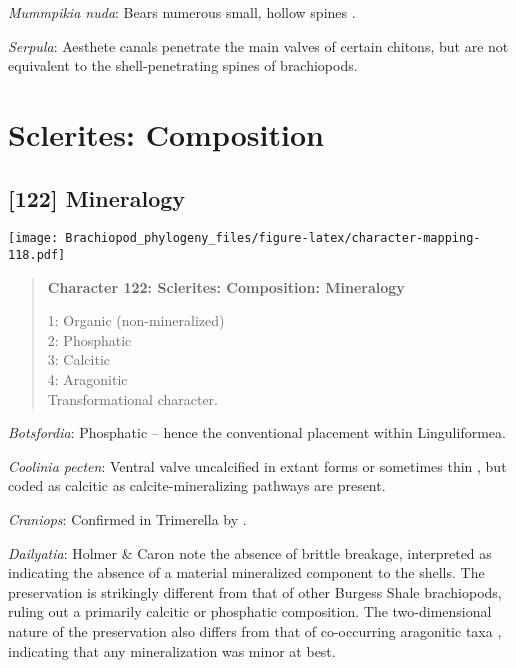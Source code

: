 \documentclass[openany]{book}
\theoremstyle{definition}
\theoremstyle{definition}
\theoremstyle{definition}
\theoremstyle{remark}
\begin{document}
\hypertarget{Mummpikia_nuda-coding-121}{}
\emph{Mummpikia nuda}: Bears numerous small, hollow spines
\citep{Williams2000LinguliformeaCraniiformea}.

\hypertarget{Serpula-coding-121}{}
\emph{Serpula}: Aesthete canals penetrate the main valves of certain
chitons, but are not equivalent to the shell-penetrating spines of
brachiopods.

\section{Sclerites: Composition}\label{sclerites-composition}

\subsection*{{[}122{]} Mineralogy}\label{mineralogy}

\texttt{[image: Brachiopod\_phylogeny\_files/figure-latex/character-mapping-118.pdf]}

\begin{quote}
\textbf{Character 122: Sclerites: Composition: Mineralogy}

1: Organic (non-mineralized)\\
2: Phosphatic\\
3: Calcitic\\
4: Aragonitic\\
Transformational character.
\end{quote}

\hypertarget{Botsfordia-coding-122}{}
\emph{Botsfordia}: Phosphatic -- hence the conventional placement within
Linguliformea.

\hypertarget{Coolinia_pecten-coding-122}{}
\emph{Coolinia pecten}: Ventral valve uncalcified in extant forms or
sometimes thin \citep{Williams2000LinguliformeaCraniiformea}, but coded
as calcitic as calcite-mineralizing pathways are present.

\hypertarget{Craniops-coding-122}{}
\emph{Craniops}: Confirmed in Trimerella by
\citet{Balthasar2011Relicaragonite}.

\hypertarget{Dailyatia-coding-122}{}
\emph{Dailyatia}: Holmer \& Caron \citeyearpar{Holmer2006Aspinose} note
the absence of brittle breakage, interpreted as indicating the absence
of a material mineralized component to the shells. The preservation is
strikingly different from that of other Burgess Shale brachiopods,
ruling out a primarily calcitic or phosphatic composition. The
two-dimensional nature of the preservation also differs from that of
co-occurring aragonitic taxa \citep[hyoliths;][
p.~273]{Holmer2006Aspinose}, indicating that any mineralization was
minor at best.
\end{document}
